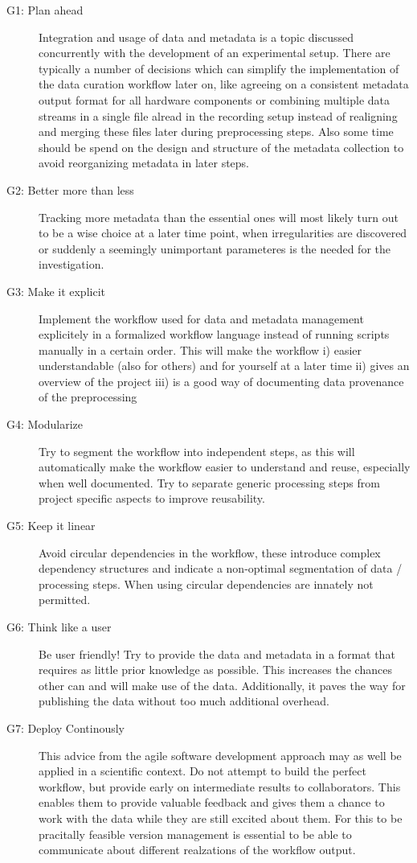 \begin{description}
 \item[G1: Plan ahead] Integration and usage of data and metadata is a topic discussed concurrently with the development of an experimental setup. There are typically a number of decisions which can simplify the implementation of the data curation workflow later on, like agreeing on a consistent metadata output format for all hardware components or combining multiple data streams in a single file alread in the recording setup instead of realigning and merging these files later during preprocessing steps. Also some time should be spend on the design and structure of the metadata collection to avoid reorganizing metadata in later steps.
 \item[G2: Better more than less] Tracking more metadata than the essential ones will most likely turn out to be a wise choice at a later time point, when irregularities are discovered or suddenly a seemingly unimportant parameteres is the needed for the investigation.
 \item[G3: Make it explicit] Implement the workflow used for data and metadata management explicitely in a formalized workflow language instead of running scripts manually in a certain order. This will make the workflow i) easier understandable (also for others) and for yourself at a later time ii) gives an overview of the project iii) is a good way of documenting data provenance of the preprocessing
 \item[G4: Modularize] Try to segment the  workflow into independent steps, as this will automatically make the workflow easier to understand and reuse, especially when well documented. Try to separate generic processing steps from project specific aspects to improve reusability.
 \item[G5: Keep it linear] Avoid circular dependencies in the  workflow, these introduce complex dependency structures and indicate a non-optimal segmentation of data / processing steps. When using  circular dependencies are innately not permitted.
 \item[G6: Think like a user] Be user friendly! Try to provide the data and metadata in a format that requires as little prior knowledge as possible. This increases the chances other can and will make use of the data. Additionally, it paves the way for publishing the data without too much additional overhead.
 \item[G7: Deploy Continously] This advice from the agile software development approach may as well be applied in a scientific context. Do not attempt to build the perfect workflow, but provide early on intermediate results to collaborators. This enables them to provide valuable feedback and gives them a chance to work with the data while they are still excited about them. For this to be pracitally feasible version management is essential to be able to communicate about different realzations of the workflow output.
\end{description}
